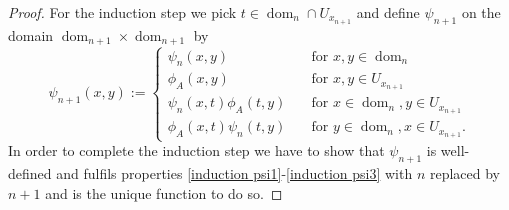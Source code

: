 \documentclass[b5paper,draft,openbib,12pt]{memoir}
\DeclareMathOperator{\dom}{dom}
\begin{document}
\begin{proof}
For the induction step we pick \(t\in \dom_n\cap U_{x_{n+1}}\) 
and define \(\psi_{n+1}\) on the domain 
\(\dom_{n+1}\times \dom_{n+1}\) by
 \begin{equation}\label{def psi induction}
 \psi_{n+1}(x,y):=\left\{\begin{matrix}
 \psi_n(x,y) \quad &\text{for }x,y\in \dom_n\\
 \phi_A(x,y) \quad &\text{for } x,y\in U_{x_{n+1}}\\
 \psi_n(x,t)\phi_A(t,y)\quad &\text{for } x\in \dom_n, y\in U_{x_{n+1}}\\
 \phi_A(x,t)\psi_n(t,y)\quad &\text{for } y\in \dom_n, x\in U_{x_{n+1}}.
 \end{matrix} \right.
 \end{equation} 
In order to complete the induction step we have to show that 
\(\psi_{n+1}\) is well-defined and fulfils properties
\eqref{induction psi1}-\eqref{induction psi3} 
with \(n\) replaced by \(n+1\) and is the unique function 
to do so.
  

\end{proof}
\end{document}
